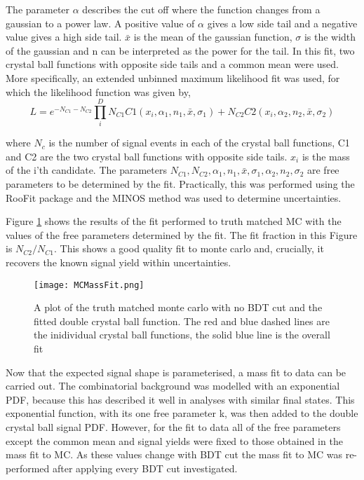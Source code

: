  The parameter $\alpha$ describes the cut off where the function changes from a gaussian to a power law. A positive value of $\alpha$ gives a low side tail and a negative value gives a high side tail.  $\bar{x}$ is the mean of the gaussian function, $\sigma$ is the width of the gaussian and n can be interpreted as the power for the tail.  In this fit, two crystal ball functions with opposite side tails and a common mean were used.  More specifically, an extended unbinned maximum likelihood fit was used, for which the likelihood function was given by,
  \begin{equation}
    L=e^{-N_{C1}-N_{C2}}\prod_i^{D}N_{C1}C1(x_i,\alpha_1,n_1,\bar{x},\sigma_1)+N_{C2}C2(x_i,\alpha_2,n_2,\bar{x},\sigma_2)
  \end{equation}

  where $N_{c}$ is the number of signal events in each of the crystal ball functions, C1 and C2 are the two crystal ball functions with opposite side tails.  $x_{i}$ is the mass of the i'th \Bd candidate. The parameters $N_{C1}, N_{C2},\alpha_1, n_1,\bar{x}, \sigma_1, \alpha_2,n_2,\sigma_2$ are free parameters to be determined by the fit.  Practically, this was performed using the RooFit package and the MINOS method was used to determine uncertainties\cite{Verkerke:2003ir}.

  Figure \ref{fig:MCfit} shows the results of the fit performed to truth matched MC with the values of the free parameters determined by the fit.  The fit fraction in this Figure is $N_{C2}/N_{C1}$.  This shows a good quality fit to monte carlo and, crucially, it recovers the known signal yield within uncertainties.

  \begin{figure}[h]
    \centering
    \texttt{[image: MCMassFit.png]}
    \caption{A plot of the truth matched monte carlo with no BDT cut and the fitted double crystal ball function.  The red and blue dashed lines are the inidividual crystal ball functions, the solid blue line is the overall fit}
    \label{fig:MCfit}
  \end{figure}

  Now that the expected signal shape is parameterised, a mass fit to data can be carried out.  The combinatorial background was modelled with an exponential PDF, because this has described it well in analyses with similar final states\cite{LHCb-PAPER-2015-019}.  This exponential function, with its one free parameter k, was then added to the double crystal ball signal PDF.  However, for the fit to data all of the free parameters except the common mean and signal yields were fixed to those obtained in the mass fit to MC.  As these values change with BDT cut the mass fit to MC was re-performed after applying every BDT cut investigated.

